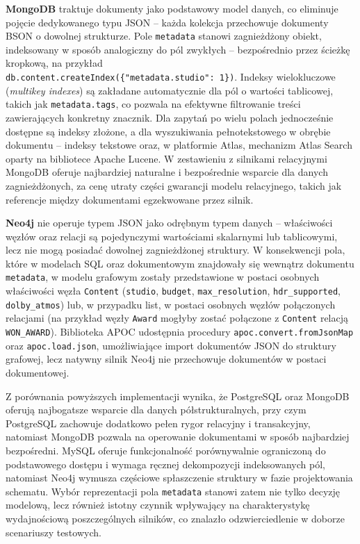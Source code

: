 \textbf{MongoDB} traktuje dokumenty jako podstawowy model danych, co
eliminuje pojęcie dedykowanego typu JSON -- każda kolekcja przechowuje
dokumenty BSON o dowolnej strukturze. Pole \texttt{metadata} stanowi
zagnieżdżony obiekt, indeksowany w sposób analogiczny do pól zwykłych --
bezpośrednio przez ścieżkę kropkową, na przykład\\
\texttt{db.content.createIndex(\{"metadata.studio": 1\})}. Indeksy
wielokluczowe (\textit{multikey indexes}) są zakładane automatycznie dla
pól o wartości tablicowej, takich jak \texttt{metadata.tags}, co pozwala
na efektywne filtrowanie treści zawierających konkretny znacznik. Dla
zapytań po wielu polach jednocześnie dostępne są indeksy złożone, a dla
wyszukiwania pełnotekstowego w obrębie dokumentu -- indeksy tekstowe
oraz, w platformie Atlas, mechanizm Atlas Search oparty na bibliotece
Apache Lucene. W zestawieniu z silnikami relacyjnymi MongoDB oferuje
najbardziej naturalne i bezpośrednie wsparcie dla danych zagnieżdżonych,
za cenę utraty części gwarancji modelu relacyjnego, takich jak referencje
między dokumentami egzekwowane przez silnik.

\textbf{Neo4j} nie operuje typem JSON jako odrębnym typem danych --
właściwości węzłów oraz relacji są pojedynczymi wartościami skalarnymi
lub tablicowymi, lecz nie mogą posiadać dowolnej zagnieżdżonej struktury.
W konsekwencji pola, które w modelach SQL oraz dokumentowym znajdowały się
wewnątrz dokumentu \texttt{metadata}, w modelu grafowym zostały
przedstawione w postaci osobnych właściwości węzła \texttt{Content}
(\texttt{studio}, \texttt{budget}, \texttt{max\_resolution},
\texttt{hdr\_supported}, \texttt{dolby\_atmos}) lub, w przypadku list,
w postaci osobnych węzłów połączonych relacjami (na przykład węzły
\texttt{Award} mogłyby zostać połączone z \texttt{Content} relacją
\texttt{WON\_AWARD}). Biblioteka APOC udostępnia procedury
\texttt{apoc.convert.fromJsonMap} oraz \texttt{apoc.load.json}, umożliwiające
import dokumentów JSON do struktury grafowej, lecz natywny silnik Neo4j
nie przechowuje dokumentów w postaci dokumentowej.

Z porównania powyższych implementacji wynika, że PostgreSQL oraz MongoDB
oferują najbogatsze wsparcie dla danych półstrukturalnych, przy czym
PostgreSQL zachowuje dodatkowo pełen rygor relacyjny i transakcyjny,
natomiast MongoDB pozwala na operowanie dokumentami w sposób najbardziej
bezpośredni. MySQL oferuje funkcjonalność porównywalnie ograniczoną do
podstawowego dostępu i wymaga ręcznej dekompozycji indeksowanych pól,
natomiast Neo4j wymusza częściowe spłaszczenie struktury w fazie
projektowania schematu. Wybór reprezentacji pola \texttt{metadata} stanowi
zatem nie tylko decyzję modelową, lecz również istotny czynnik wpływający
na charakterystykę wydajnościową poszczególnych silników, co znalazło
odzwierciedlenie w doborze scenariuszy testowych.
